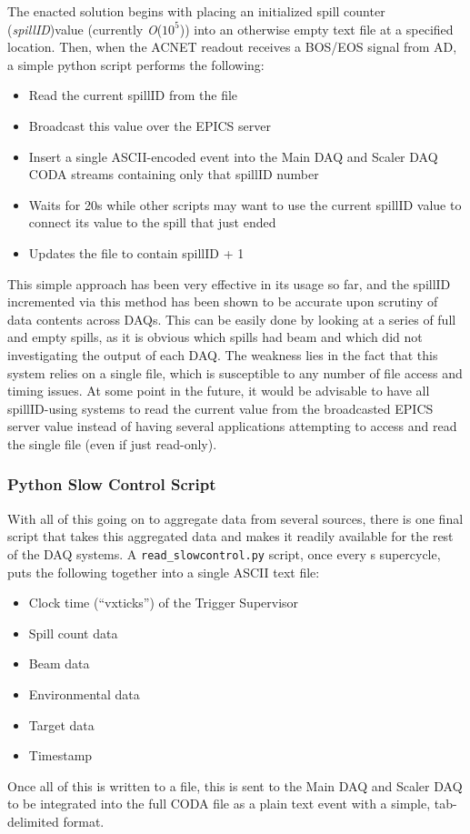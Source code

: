 The enacted solution begins with placing an initialized spill counter (\emph{spillID})value (currently \emph{O}($10^5$)) into an otherwise empty text file at a specified location. Then, when the ACNET readout receives a BOS/EOS signal from AD, a simple python script performs the following:
\begin{itemize}
	\item Read the current spillID from the file
	\item Broadcast this value over the EPICS server
	\item Insert a single ASCII-encoded event into the Main DAQ and Scaler DAQ CODA streams containing only that spillID number
	\item Waits for 20s while other scripts may want to use the current spillID value to connect its value to the spill that just ended
	\item Updates the file to contain spillID + 1
\end{itemize}

This simple approach has been very effective in its usage so far, and the spillID incremented via this method has been shown to be accurate upon scrutiny of data contents across DAQs. This can be easily done by looking at a series of full and empty spills, as it is obvious which spills had beam and which did not investigating the output of each DAQ. The weakness lies in the fact that this system relies on a single file, which is susceptible to any number of file access and timing issues. At some point in the future, it would be advisable to have all spillID-using systems to read the current value from the broadcasted EPICS server value instead of having several applications attempting to access and read the single file (even if just read-only).

\subsubsection{Python Slow Control Script}

With all of this going on to aggregate data from several sources, there is one final script that takes this aggregated data and makes it readily available for the rest of the DAQ systems. A \verb|read_slowcontrol.py| script, once every \unit[60]{s} supercycle, puts the following together into a single ASCII text file:
\begin{itemize}
	\item Clock time (``vxticks'') of the Trigger Supervisor
	\item Spill count data
	\item Beam data
	\item Environmental data
	\item Target data
	\item Timestamp
\end{itemize}

Once all of this is written to a file, this is sent to the Main DAQ and Scaler DAQ to be integrated into the full CODA file as a plain text event with a simple, tab-delimited format.